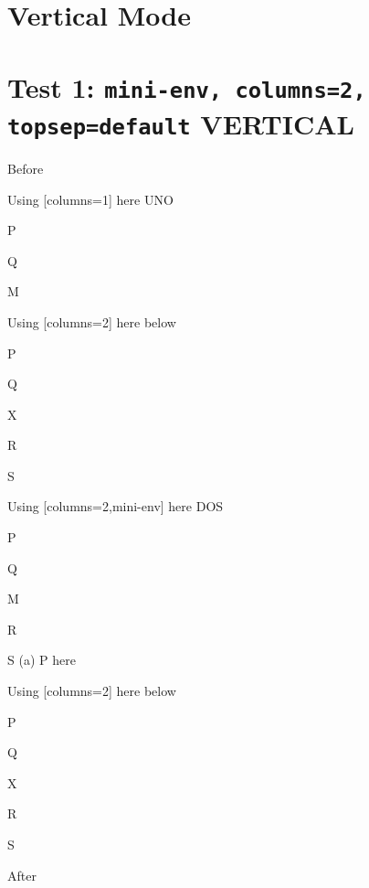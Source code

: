 \documentclass[10pt]{article}
\begin{document}

\newpage
\section*{Vertical Mode}

\section{Test 1: \texttt{mini-env, columns=2, topsep=default} VERTICAL}

Before
\begin{enumext}[columns=2]

\item Using [columns=1] here UNO

  \begin{enumext}[columns=1]%
     \item  P \item Q \item M %
  \end{enumext}

\item Using [columns=2] here below

\begin{enumext}[columns=2]%
     \item  P \item Q \item X  \item R \item S
  \end{enumext}

\columnbreak

\item Using [columns=2,mini-env] here DOS

  \begin{enumext}[columns=2,mini-env={0.4\linewidth}]%
    \item  P \item Q \item M \item R \item S
    \miniright
    (a) P here
  \end{enumext}

\item Using [columns=2] here below

\begin{enumext}[columns=2]%
     \item  P \item Q \item X  \item R \item S
  \end{enumext}

\end{enumext}
After
\end{document}
